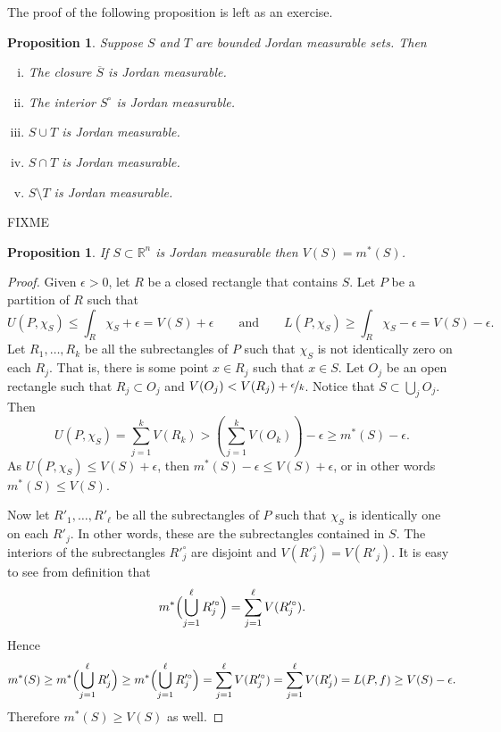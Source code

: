 \documentclass[12pt]{book}
\newcommand{\R}{{\mathbb{R}}}
\theoremstyle{plain}
\newtheorem{prop}[thm]{Proposition}
\theoremstyle{remark}
\theoremstyle{definition}
\theoremstyle{exercise}
\theoremstyle{example}
\begin{document}
The proof of the following proposition is left as an exercise.

\begin{prop} \label{prop:jordanmeas}
Suppose $S$ and $T$ are bounded Jordan measurable sets.
Then
\begin{enumerate}[(i)]
\item The closure $\overline{S}$ is Jordan measurable.
\item The interior $S^\circ$ is Jordan measurable.
\item $S \cup T$ is Jordan measurable.
\item $S \cap T$ is Jordan measurable.
\item $S \setminus T$ is Jordan measurable.
\end{enumerate}
\end{prop}

FIXME

\begin{prop}
If $S \subset \R^n$ is Jordan measurable then $V(S) = m^*(S)$.
\end{prop}

\begin{proof}
Given $\epsilon > 0$,
let $R$ be a closed rectangle that contains $S$.  Let $P$ be a partition
of $R$ such that 
\begin{equation*}
U(P,\chi_S) \leq \int_R \chi_S + \epsilon = V(S) + \epsilon
\qquad \text{and} \qquad
L(P,\chi_S) \geq \int_R \chi_S - \epsilon = V(S)-\epsilon.
\end{equation*}
Let $R_1,\ldots,R_k$ be all the subrectangles of $P$ such that $\chi_S$ is not
identically zero on each $R_j$.  That is, there is some point $x \in R_j$ such
that $x \in S$.  Let $O_j$ be an open rectangle such that $R_j \subset O_j$
and $V(O_j) < V(R_j) + \nicefrac{\epsilon}{k}$.  Notice that $S \subset
\bigcup_j O_j$.  Then
\begin{equation*}
U(P,\chi_S) = \sum_{j=1}^k V(R_k) > 
\left(\sum_{j=1}^k V(O_k)\right) - \epsilon \geq m^*(S) - \epsilon .
\end{equation*}
As 
$U(P,\chi_S) \leq V(S) + \epsilon$, then
$m^*(S) - \epsilon \leq V(S) + \epsilon$, or in other words
$m^*(S) \leq V(S)$.

Now let $R'_1,\ldots,R'_\ell$ be all the subrectangles of $P$ such that
$\chi_S$ is identically one on each $R'_j$.  In other words,
these are the subrectangles contained in $S$.
  The interiors
of the subrectangles $R'^\circ_j$ are disjoint and
$V(R'^\circ_j) = V(R'_j)$.  It is easy to see from definition
that 
\begin{equation*}
m^*\Bigl(\bigcup_{j=1}^\ell R'^\circ_j\Bigr)
=
\sum_{j=1}^\ell
V(R'^\circ_j) .
\end{equation*}
Hence
\begin{equation*}
m^*(S) \geq
m^*\Bigl(\bigcup_{j=1}^\ell R'_j\Bigr)
\geq
m^*\Bigl(\bigcup_{j=1}^\ell R'^\circ_j\Bigr)
=
\sum_{j=1}^\ell
V(R'^\circ_j)
=
\sum_{j=1}^\ell
V(R'_j)
=
L(P,f) \geq V(S) - \epsilon .
\end{equation*}
Therefore $m^*(S) \geq V(S)$ as well.
\end{proof}
\end{document}
